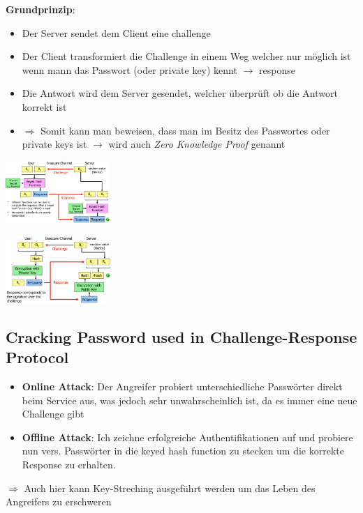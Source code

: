 \documentclass{report}
\newenvironment{Figure}
	{\par\medskip\noindent\minipage{\linewidth}}
	{\endminipage\par\medskip}
\theoremstyle{definition}
\theoremstyle{example}
\begin{document}
\textbf{Grundprinzip}:
\begin{itemize}
	\item Der Server sendet dem Client eine challenge
	\item Der Client transformiert die Challenge in einem Weg welcher nur möglich ist wenn mann das Passwort (oder private key) kennt $\rightarrow$ response
	\item Die Antwort wird dem Server gesendet, welcher überprüft ob die Antwort korrekt ist
	\item $\Rightarrow$ Somit kann man beweisen, dass man im Besitz des Passwortes oder private keys ist $\rightarrow$ wird auch \textit{Zero Knowledge Proof} genannt
\end{itemize}

\begin{Figure}
\centering
\includegraphics[width=150px]{img/CRPSharedSecret.png}
	\label{fig:Challenge-Response Protocols with Shared Secrets}
\end{Figure}

\begin{Figure}
\centering
\includegraphics[width=150px]{img/CRPDigitalSignature.png}
	\label{fig:Challenge-Response Protocols with Digital Signature}
\end{Figure}

	\subsection{Cracking Password used in Challenge-Response Protocol}
\begin{itemize}
	\item \textbf{Online Attack}: Der Angreifer probiert unterschiedliche Passwörter direkt beim Service aus, was jedoch sehr unwahrscheinlich ist, da es immer eine neue Challenge gibt
	\item \textbf{Offline Attack}: Ich zeichne erfolgreiche Authentifikationen auf und probiere nun vers. Passwörter in die keyed hash function zu stecken um die korrekte Response zu erhalten.
\end{itemize}
$\Rightarrow$ Auch hier kann Key-Streching ausgeführt werden um das Leben des Angreifers zu erschweren
\end{document}
